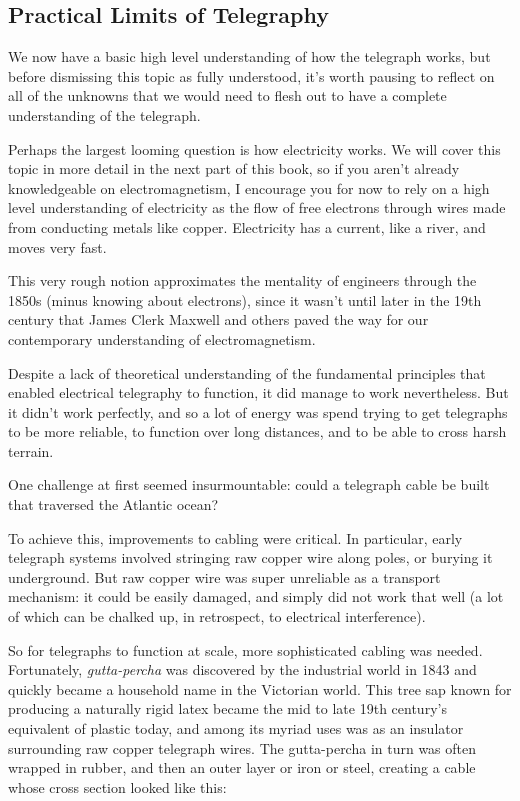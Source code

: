 \documentclass[UTF8]{book}
\begin{document}
\begin{CJK}{UTF8}{gbsn}
\section{Practical Limits of Telegraphy}

We now have a basic high level understanding of how the telegraph works, but before dismissing this topic as fully understood, it's worth pausing to reflect on all of the unknowns that we would need to flesh out to have a complete understanding of the telegraph.

Perhaps the largest looming question is how electricity works. We will cover this topic in more detail in the next part of this book, so if you aren't already knowledgeable on electromagnetism, I encourage you for now to rely on a high level understanding of electricity as the flow of free electrons through wires made from conducting metals like copper. Electricity has a current, like a river, and moves very fast.

This very rough notion approximates the mentality of engineers through the 1850s (minus knowing about electrons), since it wasn't until later in the 19th century that James Clerk Maxwell and others paved the way for our contemporary understanding of electromagnetism.

Despite a lack of theoretical understanding of the fundamental principles that enabled electrical telegraphy to function, it did manage to work nevertheless. But it didn't work perfectly, and so a lot of energy was spend trying to get telegraphs to be more reliable, to function over long distances, and to be able to cross harsh terrain.

One challenge at first seemed insurmountable: could a telegraph cable be built that traversed the Atlantic ocean?

To achieve this, improvements to cabling were critical. In particular, early telegraph systems involved stringing raw copper wire along poles, or burying it underground. But raw copper wire was super unreliable as a transport mechanism: it could be easily damaged, and simply did not work that well (a lot of which can be chalked up, in retrospect, to electrical interference).

So for telegraphs to function at scale, more sophisticated cabling was needed. Fortunately, \emph{gutta-percha} was discovered by the industrial world in 1843 and quickly became a household name in the Victorian world. This tree sap known for producing a naturally rigid latex became the mid to late 19th century's equivalent of plastic today, and among its myriad uses was as an insulator surrounding raw copper telegraph wires. The gutta-percha in turn was often wrapped in rubber, and then an outer layer or iron or steel, creating a cable whose cross section looked like this:


\end{CJK}
\end{document}
